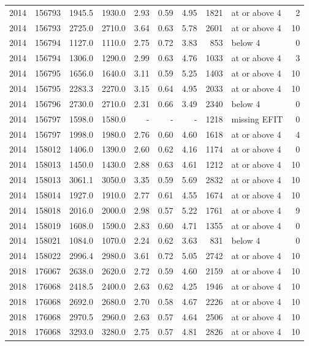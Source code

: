 \begin{longtable}{@{}rrrrrrrrlr@{}}
2014 & 156793 & 1945.5 & 1930.0 & 2.93 & 0.59 & 4.95 & 1821 & at or above 4 & 2 \\
2014 & 156793 & 2725.0 & 2710.0 & 3.64 & 0.63 & 5.78 & 2601 & at or above 4 & 10 \\
2014 & 156794 & 1127.0 & 1110.0 & 2.75 & 0.72 & 3.83 & 853 & below 4 & 0 \\
2014 & 156794 & 1306.0 & 1290.0 & 2.99 & 0.63 & 4.76 & 1033 & at or above 4 & 3 \\
2014 & 156795 & 1656.0 & 1640.0 & 3.11 & 0.59 & 5.25 & 1403 & at or above 4 & 10 \\
2014 & 156795 & 2283.3 & 2270.0 & 3.15 & 0.64 & 4.95 & 2033 & at or above 4 & 10 \\
2014 & 156796 & 2730.0 & 2710.0 & 2.31 & 0.66 & 3.49 & 2340 & below 4 & 0 \\
2014 & 156797 & 1598.0 & 1580.0 & - & - & - & 1218 & missing EFIT & 0 \\
2014 & 156797 & 1998.0 & 1980.0 & 2.76 & 0.60 & 4.60 & 1618 & at or above 4 & 4 \\
2014 & 158012 & 1406.0 & 1390.0 & 2.60 & 0.62 & 4.16 & 1174 & at or above 4 & 0 \\
2014 & 158013 & 1450.0 & 1430.0 & 2.88 & 0.63 & 4.61 & 1212 & at or above 4 & 10 \\
2014 & 158013 & 3061.1 & 3050.0 & 3.35 & 0.59 & 5.69 & 2832 & at or above 4 & 10 \\
2014 & 158014 & 1927.0 & 1910.0 & 2.77 & 0.61 & 4.55 & 1674 & at or above 4 & 10 \\
2014 & 158018 & 2016.0 & 2000.0 & 2.98 & 0.57 & 5.22 & 1761 & at or above 4 & 9 \\
2014 & 158019 & 1608.0 & 1590.0 & 2.83 & 0.60 & 4.71 & 1355 & at or above 4 & 0 \\
2014 & 158021 & 1084.0 & 1070.0 & 2.24 & 0.62 & 3.63 & 831 & below 4 & 0 \\
2014 & 158022 & 2996.4 & 2980.0 & 3.61 & 0.72 & 5.05 & 2742 & at or above 4 & 10 \\
2018 & 176067 & 2638.0 & 2620.0 & 2.72 & 0.59 & 4.60 & 2159 & at or above 4 & 10 \\
2018 & 176068 & 2418.5 & 2400.0 & 2.63 & 0.62 & 4.25 & 1946 & at or above 4 & 10 \\
2018 & 176068 & 2692.0 & 2680.0 & 2.70 & 0.58 & 4.67 & 2226 & at or above 4 & 10 \\
2018 & 176068 & 2970.5 & 2960.0 & 2.63 & 0.57 & 4.64 & 2506 & at or above 4 & 10 \\
2018 & 176068 & 3293.0 & 3280.0 & 2.75 & 0.57 & 4.81 & 2826 & at or above 4 & 10 \\

\end{longtable}

